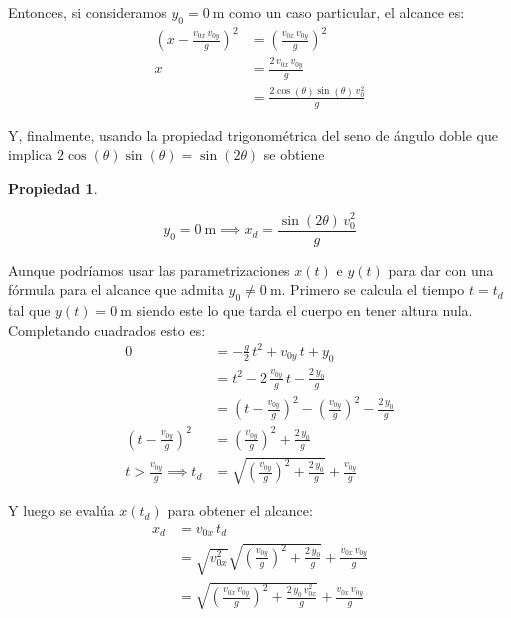 \documentclass[a5paper,12pt,twoside]{book}
\newtheorem{prop}{{Propiedad}}[chapter]
\begin{document}
Entonces, si consideramos $y_0=\SI{0}{\metre}$ como un caso particular, el alcance es:
\begin{align*}
    \left(x - \frac{v_{0x} \, v_{0y}}{g}\right)^2 &= \left(\frac{v_{0x} \, v_{0y}}{g}\right)^2
    \\[1ex]
    x &= \frac{2 \, v_{0x} \, v_{0y}}{g}
    \\[1ex]
    &= \frac{2 \cos(\theta) \sin(\theta) \, v_0^2}{g}
\end{align*}

Y, finalmente, usando la propiedad trigonométrica del seno de ángulo doble que implica $2 \cos(\theta) \sin(\theta)=\sin(2\theta)$ se obtiene

\begin{mdframed}[style=MyFrame1]
    \begin{prop}
        \label{prop:oblicuoAlcance}
    \end{prop}
    \begin{equation*}
        y_0 = \SI{0}{\metre} \implies x_d = \frac{\sin(2\theta) \, v_0^2}{g}
    \end{equation*}
\end{mdframed}

Aunque podríamos usar las parametrizaciones $x(t)$ e $y(t)$ para dar con una fórmula para el alcance que admita $y_0 \neq \SI{0}{\metre}$. Primero se calcula el tiempo $t=t_d$ tal que $y(t)=\SI{0}{\metre}$ siendo este lo que tarda el cuerpo en tener altura nula. Completando cuadrados esto es:
\begin{align*}
    0 &= -\frac{g}{2} \, t^2 + v_{0y} \, t + y_0
    \\[1ex]
    &= t^2 - 2 \, \frac{v_{0y}}{g} \, t - \frac{2\,y_0}{g}
    \\[1ex]
    &= \left( t - \frac{v_{0y}}{g} \right)^2 - \left(\frac{v_{0y}}{g}\right)^2 - \frac{2\,y_0}{g}
    \\[1ex]
    \left( t - \frac{v_{0y}}{g} \right)^2 &= \left(\frac{v_{0y}}{g}\right)^2 + \frac{2\,y_0}{g}
    \\[1ex]
    t>\frac{v_{0y}}{g} \implies t_d &= \sqrt{\left(\frac{v_{0y}}{g}\right)^2 + \frac{2\,y_0}{g}} + \frac{v_{0y}}{g}
\end{align*}

Y luego se evalúa $x(t_d)$ para obtener el alcance:
\begin{align*}
    x_d &= v_{0x} \, t_d
    \\[1ex]
    &= \sqrt{v_{0x}^2} \sqrt{\left(\frac{v_{0y}}{g}\right)^2 + \frac{2\,y_0}{g}} + \frac{v_{0x}\,v_{0y}}{g}
    \\[1ex]
    &= \sqrt{\left(\frac{v_{0x}\,v_{0y}}{g}\right)^2 + \frac{2 \, y_0 \, v_{0x}^2}{g}} + \frac{v_{0x}\,v_{0y}}{g}
\end{align*}
\end{document}

